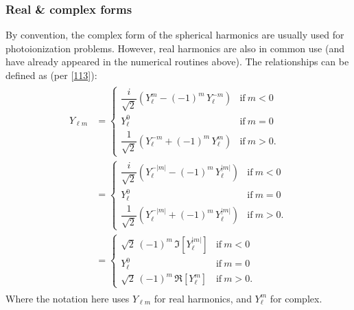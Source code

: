 \documentclass[letterpaper,table,10pt,english]{jupyterBook}
\begin{document}
\subsubsection{Real \& complex forms}
\label{\detokenize{part1/theory_observables_intro_100723:real-complex-forms}}
\sphinxAtStartPar
By convention, the complex form of the spherical harmonics are usually used for photoionization problems. However, real harmonics are also in common use (and have already appeared in the numerical routines above). The relationships can be defined as (per  {[}\hyperlink{cite.backmatter/bibliography:id942}{113}{]}):
\begin{equation}\label{equation:part1/theory_observables_intro_100723:eq:re-complex-YLM}
\begin{split}
\begin{aligned}
Y_{\ell m}&={\begin{cases}{\dfrac {i}{\sqrt {2}}}\left(Y_{\ell }^{m}-(-1)^{m}\,Y_{\ell }^{-m}\right)&{\text{if}}\ m\lt0
\\Y_{\ell }^{0}&{\text{if}}\ m=0
\\{\dfrac {1}{\sqrt {2}}}\left(Y_{\ell }^{-m}+(-1)^{m}\,Y_{\ell }^{m}\right)&{\text{if}}\ m\gt0.\end{cases}}
\\&={\begin{cases}{\dfrac {i}{\sqrt {2}}}\left(Y_{\ell }^{-|m|}-(-1)^{m}\,Y_{\ell }^{|m|}\right)&{\text{if}}\ m\lt0
\\Y_{\ell }^{0}&{\text{if}}\ m=0
\\{\dfrac {1}{\sqrt {2}}}\left(Y_{\ell }^{-|m|}+(-1)^{m}\,Y_{\ell }^{|m|}\right)&{\text{if}}\ m\gt0.\end{cases}}
\\&={\begin{cases}{\sqrt {2}}\,(-1)^{m}\,\Im [{Y_{\ell }^{|m|}}]&{\text{if}}\ m\lt0
\\Y_{\ell }^{0}&{\text{if}}\ m=0
\\{\sqrt {2}}\,(-1)^{m}\,\Re [{Y_{\ell }^{m}}]&{\text{if}}\ m\gt0.\end{cases}}
\end{aligned}
\end{split}
\end{equation}
\sphinxAtStartPar
Where the notation here uses \(Y_{\ell m}\) for real harmonics, and \(Y_{\ell }^{m}\) for complex.
\end{document}
